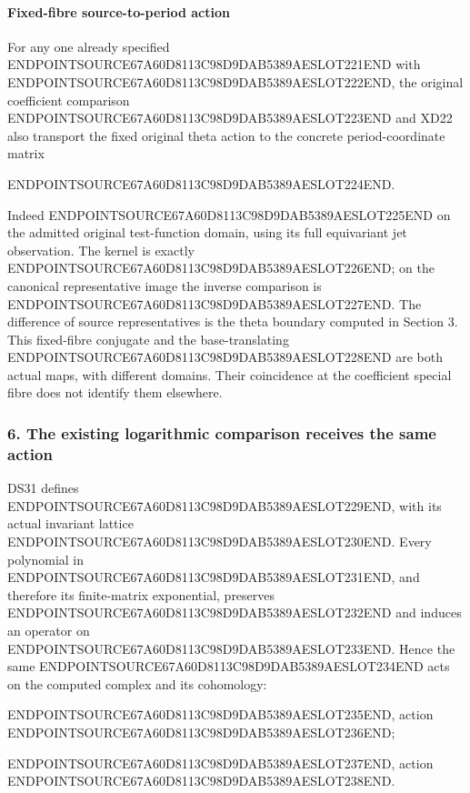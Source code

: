 \paragraph{Fixed-fibre source-to-period action}\label{endpoint-f1_scaling--fixed-fibre-source-to-period-action}

For any one already specified ENDPOINTSOURCE67A60D8113C98D9DAB5389AESLOT221END with ENDPOINTSOURCE67A60D8113C98D9DAB5389AESLOT222END, the original coefficient comparison ENDPOINTSOURCE67A60D8113C98D9DAB5389AESLOT223END and XD22 also transport the fixed original theta action to the concrete period-coordinate matrix

ENDPOINTSOURCE67A60D8113C98D9DAB5389AESLOT224END.

Indeed ENDPOINTSOURCE67A60D8113C98D9DAB5389AESLOT225END on the admitted original test-function domain, using its full equivariant jet observation. The kernel is exactly ENDPOINTSOURCE67A60D8113C98D9DAB5389AESLOT226END; on the canonical representative image the inverse comparison is ENDPOINTSOURCE67A60D8113C98D9DAB5389AESLOT227END. The difference of source representatives is the theta boundary computed in Section 3. This fixed-fibre conjugate and the base-translating ENDPOINTSOURCE67A60D8113C98D9DAB5389AESLOT228END are both actual maps, with different domains. Their coincidence at the coefficient special fibre does not identify them elsewhere.

\subsubsection{6. The existing logarithmic comparison receives the same action}\label{endpoint-f1_scaling--the-existing-logarithmic-comparison-receives-the-same-action}

DS31 defines ENDPOINTSOURCE67A60D8113C98D9DAB5389AESLOT229END, with its actual invariant lattice ENDPOINTSOURCE67A60D8113C98D9DAB5389AESLOT230END. Every polynomial in ENDPOINTSOURCE67A60D8113C98D9DAB5389AESLOT231END, and therefore its finite-matrix exponential, preserves ENDPOINTSOURCE67A60D8113C98D9DAB5389AESLOT232END and induces an operator on ENDPOINTSOURCE67A60D8113C98D9DAB5389AESLOT233END. Hence the same ENDPOINTSOURCE67A60D8113C98D9DAB5389AESLOT234END acts on the computed complex and its cohomology:

ENDPOINTSOURCE67A60D8113C98D9DAB5389AESLOT235END, action ENDPOINTSOURCE67A60D8113C98D9DAB5389AESLOT236END;

ENDPOINTSOURCE67A60D8113C98D9DAB5389AESLOT237END, action ENDPOINTSOURCE67A60D8113C98D9DAB5389AESLOT238END.

